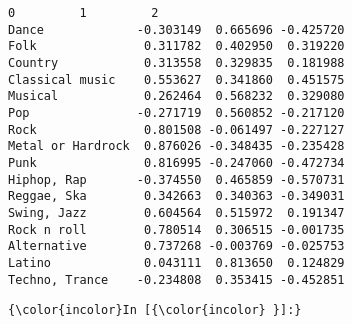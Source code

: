 \documentclass[11pt]{article}
\begin{document}
    \begin{Verbatim}[commandchars=\\\{\}]
                          0         1         2
Dance             -0.303149  0.665696 -0.425720
Folk               0.311782  0.402950  0.319220
Country            0.313558  0.329835  0.181988
Classical music    0.553627  0.341860  0.451575
Musical            0.262464  0.568232  0.329080
Pop               -0.271719  0.560852 -0.217120
Rock               0.801508 -0.061497 -0.227127
Metal or Hardrock  0.876026 -0.348435 -0.235428
Punk               0.816995 -0.247060 -0.472734
Hiphop, Rap       -0.374550  0.465859 -0.570731
Reggae, Ska        0.342663  0.340363 -0.349031
Swing, Jazz        0.604564  0.515972  0.191347
Rock n roll        0.780514  0.306515 -0.001735
Alternative        0.737268 -0.003769 -0.025753
Latino             0.043111  0.813650  0.124829
Techno, Trance    -0.234808  0.353415 -0.452851

    \end{Verbatim}

    \begin{Verbatim}[commandchars=\\\{\}]
{\color{incolor}In [{\color{incolor} }]:} 
\end{Verbatim}



    
    
    
    
\end{document}
